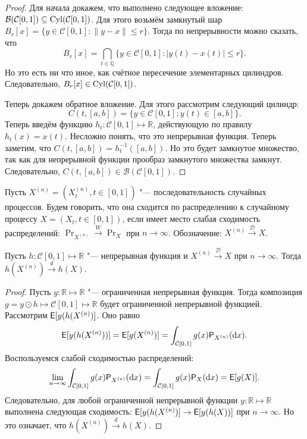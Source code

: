 \begin{proof}
	Для начала докажем, что выполнено следующее вложение: $\mathcal{B}(\mathcal{C}[0, 1]) \subseteq \operatorname{Cyl}(\mathcal{C}[0, 1])$. Для этого возьмём замкнутый шар $B_{r}[x] = \{y \in \mathcal{C}[0, 1] \colon \|y - x\| \leq r\}$. Тогда по непрерывности можно сказать, что
	\begin{equation}
		B_{r}[x] = \bigcap_{t \in \mathbb{Q}} \{y \in \mathcal{C}[0, 1] \colon |y(t) - x(t)| \leq r\}.
	\end{equation}
	Но это есть ни что иное, как счётное пересечение элементарных цилиндров. Следовательно, $B_{r}[x] \in \operatorname{Cyl}(\mathcal{C}[0, 1])$.

	Теперь докажем обратное вложение. Для этого рассмотрим следующий цилиндр:
	\begin{equation}
		C(t, [a, b]) = \{y \in \mathcal{C}[0, 1] \colon y(t) \in [a, b]\}.
	\end{equation}
	Теперь введём функцию $h_{t} \colon \mathcal{C}[0, 1] \mapsto \mathbb{R}$, действующую по правилу $h_{t}(x) = x(t)$. Несложно понять, что это непрерывная функция. Теперь заметим, что $C(t, [a, b]) = h^{-1}_{t}([a, b])$. Но это будет замкнутое множество, так как для непрерывной функции прообраз замкнутого множества замкнут. Следовательно, $C(t, [a, b]) \in \mathcal{B}(\mathcal{C}[0, 1])$.
\end{proof}
\begin{definition}
	Пусть $X^{(n)} = (X^{(n)}_{t}, t \in [0, 1])$ "--- последовательность случайных процессов. Будем говорить, что она сходится по распределению к случайному процессу $X = (X_{t}, t \in [0, 1])$, если имеет место слабая сходимость распределений: $\Pr_{X^{(n)}} \xrightarrow{W} \Pr_{X}$ при $n \to \infty$. Обозначение: $X^{(n)} \xrightarrow{\mathcal{D}} X$.
\end{definition}
\begin{theorem}
	Пусть $h \colon \mathcal{C}[0, 1] \mapsto \mathbb{R}$ "--- непрерывная функция и $X^{(n)} \xrightarrow{\mathcal{D}} X$ при $n \to \infty$. Тогда $h(X^{(n)}) \xrightarrow{d} h(X)$. 
\end{theorem}
\begin{proof}
	Пусть $y \colon \mathbb{R} \mapsto \mathbb{R}$ "--- ограниченная непрерывная функция. Тогда композиция $g = y \odot h \mapsto \mathcal{C}[0, 1] \mapsto \mathbb{R}$ будет ограниченной непрерывной функцией. Рассмотрим $\operatorname{\mathsf{E}}[y(h(X^{(n)})]$. Оно равно  
	\begin{equation}
		\operatorname{\mathsf{E}}[y(h(X^{(n)}))] = \operatorname{\mathsf{E}}[g(X^{(n)})] = \int_{\mathcal{C}[0, 1]} g(x)\mathsf{P}_{X^{(n)}}(\dd x).
	\end{equation}
	Воспользуемся слабой сходимостью распределений:
	\begin{equation}
		\lim_{n \to \infty} \int_{\mathcal{C}[0, 1]} g(x)\mathsf{P}_{X^{(n)}}(\dd x)
		= \int_{\mathcal{C}[0, 1]} g(x)\mathsf{P}_{X}(\dd x)
		= \operatorname{\mathsf{E}}[g(X)].
	\end{equation}
	Следовательно, для любой ограниченной непрерывной функции $y \colon \mathbb{R} \mapsto \mathbb{R}$ выполнена следующая сходимость: $\operatorname{\mathsf{E}}[y(h(X^{(n)})] \to \operatorname{\mathsf{E}}[y(h(X))]$ при $n \to \infty$. Но это означает, что $h(X^{(n)}) \xrightarrow{d} h(X)$.
\end{proof}

